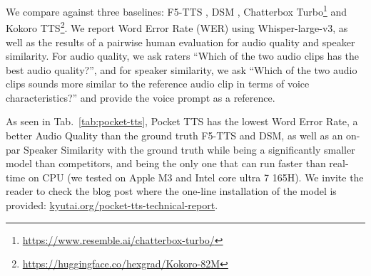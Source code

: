 We compare against three baselines: F5-TTS \citep{f5tts}, DSM \citep{delayed_stream_modeling}, Chatterbox Turbo\footnote{\url{https://www.resemble.ai/chatterbox-turbo/}} and Kokoro TTS\footnote{\url{https://huggingface.co/hexgrad/Kokoro-82M}}. We report Word Error Rate (WER) using Whisper-large-v3\citep{whisper}, as well as the results of a pairwise human evaluation for audio quality and speaker similarity. For audio quality, we ask raters “Which of the two audio clips has the best audio quality?”, and for speaker similarity, we ask “Which of the two audio clips sounds more similar to the reference audio clip in terms of voice characteristics?” and provide the voice prompt as a reference.

\begin{table}[h]
\caption{{Comparison of TTS models on Librispeech test-clean.}}
\centering
{}
\label{tab:pocket-tts}
\end{table}

As seen in Tab.~\ref{tab:pocket-tts}, Pocket TTS has the lowest Word Error Rate, a better Audio Quality than the ground truth F5-TTS and DSM, as well as an on-par Speaker Similarity with the ground truth while being a significantly smaller model than competitors, and being the only one that can run faster than real-time on CPU (we tested on Apple M3 and Intel core ultra 7 165H). We invite the reader to check the blog post where the one-line installation of the model is provided: \href{https://kyutai.org/pocket-tts-technical-report}{kyutai.org/pocket-tts-technical-report}.


